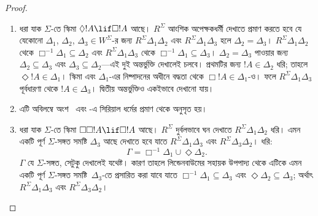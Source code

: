\documentclass[../../../include/open-logic-section]{subfiles}
\begin{document}
\begin{proof}
  \begin{enumerate}
  \item ধরা যাক $\Sigma$-তে স্কিমা $\Diamond !A \lif
    \Box !A$ আছে। $R^\Sigma$ আংশিক অপেক্ষকধর্মী দেখাতে প্রমাণ করতে হবে যে যেকোনো $\Delta_1$, $\Delta_2$, $\Delta_3 \in
    W^\Sigma$-র জন্য $R^\Sigma \Delta_1\Delta_2$ এবং $R^\Sigma
    \Delta_1\Delta_3$ হলে $\Delta_2=\Delta_3$। $R^\Sigma
    \Delta_1\Delta_2$ থেকে $\Box^{-1}\Delta_1 \subseteq \Delta_2$ এবং $R^\Sigma \Delta_1\Delta_3$ থেকে $\Box^{-1}\Delta_1
    \subseteq \Delta_3$। $\Delta_2=\Delta_3$ পাওয়ার জন্য $\Delta_2 \subseteq \Delta_3$ এবং $\Delta_3 \subseteq
    \Delta_2$—এই দুই অন্তর্ভুক্তি দেখালেই চলবে। প্রথমটির জন্য $!A \in \Delta_2$ ধরি; তাহলে $\Diamond!A \in \Delta_1$। স্কিমা এবং $\Delta_1$-এর নিষ্পাদনের অধীনে বদ্ধতা থেকে $\Box!A \in \Delta_1$-ও। ফলে $R^\Sigma \Delta_1\Delta_3$ পূর্বধারণা থেকে $!A \in \Delta_3$। দ্বিতীয় অন্তর্ভুক্তিও একইভাবে দেখানো যায়।

  \item এটি অবিলম্বে অংশ~ এবং -এ সিরিয়াল ধর্মের প্রমাণ থেকে অনুসৃত হয়।

  \item ধরা যাক $\Sigma$-তে স্কিমা $\Box\Box!A \lif \Box!A$ আছে। $R^\Sigma$ দুর্বলভাবে ঘন দেখাতে $R^\Sigma
    \Delta_1\Delta_2$ ধরি। এমন একটি পূর্ণ $\Sigma$-সঙ্গত সমষ্টি $\Delta_3$ আছে দেখাতে হবে যাতে $R^\Sigma
    \Delta_1\Delta_3$ এবং $R^\Sigma \Delta_3\Delta_2$। ধরি:
    \[
    \Gamma = \Box^{-1}\Delta_1 \cup \Diamond\Delta_2.
    \]
    $\Gamma$ যে $\Sigma$-সঙ্গত, সেটুকু দেখালেই যথেষ্ট। কারণ তাহলে লিন্ডেনবাউমের সহায়ক উপপাদ্য থেকে এটিকে এমন একটি পূর্ণ $\Sigma$-সঙ্গত সমষ্টি~$\Delta_3$-তে প্রসারিত করা যাবে যাতে $\Box^{-1}\Delta_1
    \subseteq \Delta_3$ এবং $\Diamond\Delta_2 \subseteq \Delta_3$; অর্থাৎ $R^\Sigma \Delta_1\Delta_3$ এবং $R^\Sigma
    \Delta_3\Delta_2$।


\end{enumerate}
\end{proof}
\end{document}
